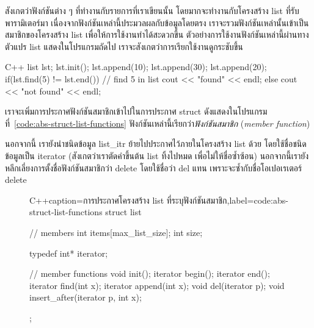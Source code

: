 สังเกต{\wbr}ว่า{\wbr}ฟังก์ชัน{\wbr}ต่าง ๆ ที่ทำงาน{\wbr}กับ{\wbr}รายการ{\wbr}ที่{\wbr}เรา{\wbr}เขียน{\wbr}นั้น โดยมาก{\wbr}จะ{\wbr}ทำงาน{\wbr}กับ{\wbr}โครงสร้าง{\wbr}
{\ct list} ที่{\wbr}รับ{\wbr}พารามิเตอร์{\wbr}มา เนื่องจาก{\wbr}ฟังก์ชัน{\wbr}เหล่านี้{\wbr}ประมวลผล{\wbr}กับ{\wbr}ข้อมูล{\wbr}โดย{\wbr}ตรง{\wbr}
เรา{\wbr}จะ{\wbr}รวม{\wbr}ฟังก์ชัน{\wbr}เหล่านั้น{\wbr}เข้า{\wbr}เป็น{\wbr}สมาชิก{\wbr}ของ{\wbr}โครงสร้าง {\ct list}
เพื่อให้{\wbr}การ{\wbr}ใช้{\wbr}งาน{\wbr}ทำ{\wbr}ได้{\wbr}สะดวก{\wbr}ขึ้น ตัวอย่าง{\wbr}การ{\wbr}ใช้{\wbr}งาน{\wbr}ฟังก์ชัน{\wbr}เหล่านี้{\wbr}ผ่าน{\wbr}ทาง{\wbr}ตัวแปร {\ct
  list} แสดง{\wbr}ใน{\wbr}โปรแกรม{\wbr}ถัด{\wbr}ไป เรา{\wbr}จะ{\wbr}สังเกต{\wbr}ว่า{\wbr}การ{\wbr}เรียก{\wbr}ใช้{\wbr}งาน{\wbr}ดู{\wbr}กระชับ{\wbr}ขึ้น{\wbr}

\latintext
\begin{codelist}{C++}{}
  list lst;
  lst.init();
  lst.append(10);  lst.append(30);  lst.append(20);
  if(lst.find(5) != lst.end())  // find 5 in list
    cout << "found" << endl;
  else
    cout << "not found" << endl;
\end{codelist}
\thaitext

เรา{\wbr}จะ{\wbr}เพิ่ม{\wbr}การ{\wbr}ประกาศ{\wbr}ฟังก์ชัน{\wbr}สมาชิก{\wbr}เข้า{\wbr}ไป{\wbr}ใน{\wbr}การ{\wbr}ประกาศ {\ct struct}
ดัง{\wbr}แสดง{\wbr}ใน{\wbr}โปรแกรม{\wbr}ที่~\ref{code:abs-struct-list-functions}
ฟังก์ชัน{\wbr}เหล่านี้{\wbr}เรียก{\wbr}ว่า{\em ฟังก์ชัน{\wbr}สมาชิก} ({\em member function})

นอกจากนี้ เรา{\wbr}ยัง{\wbr}นำ{\wbr}ชนิด{\wbr}ข้อมูล {\ct list\_itr} ย้าย{\wbr}ไป{\wbr}ประกาศ{\wbr}ไว้{\wbr}ภายใน{\wbr}โครงสร้าง {\ct
  list} ด้วย โดย{\wbr}ใช้{\wbr}ชื่อ{\wbr}ชนิด{\wbr}ข้อมูล{\wbr}เป็น {\ct iterator} (สังเกต{\wbr}ว่า{\wbr}เรา{\wbr}ตัด{\wbr}คำขึ้นต้น {\ct
  list} ทิ้ง{\wbr}ไป{\wbr}หมด เพื่อ{\wbr}ไม่{\wbr}ให้{\wbr}ชื่อ{\wbr}ซ้ำซ้อน) นอกจากนี้{\wbr}เรา{\wbr}ยัง{\wbr}หลีกเลี่ยง{\wbr}การ{\wbr}ตั้ง{\wbr}ชื่อ{\wbr}ฟังก์ชัน{\wbr}สมาชิก{\wbr}ว่า{\wbr}
{\ct delete} โดย{\wbr}ใช้{\wbr}ชื่อ{\wbr}ว่า {\ct del} แทน เพราะ{\wbr}จะ{\wbr}ซ้ำ{\wbr}กับ{\wbr}ชื่อ{\wbr}โอ{\wbr}เปอเรเตอร์ {\ct
  delete}

\begin{figure}
\latintext
\begin{codelist}{C++}{caption={\thaitext การ{\wbr}ประกาศ{\wbr}โครงสร้าง {\ct list} ที่{\wbr}ระบุ{\wbr}ฟังก์ชัน{\wbr}สมาชิก\latintext},label=code:abs-struct-list-functions}
struct list {
  // members
  int items[max_list_size];
  int size;

  typedef int* iterator;

  // member functions
  void init();
  iterator begin();
  iterator end();
  iterator find(int x);
  iterator append(int x);
  void del(iterator p);
  void insert_after(iterator p, int x);
};
\end{codelist}
\thaitext
\end{figure}

